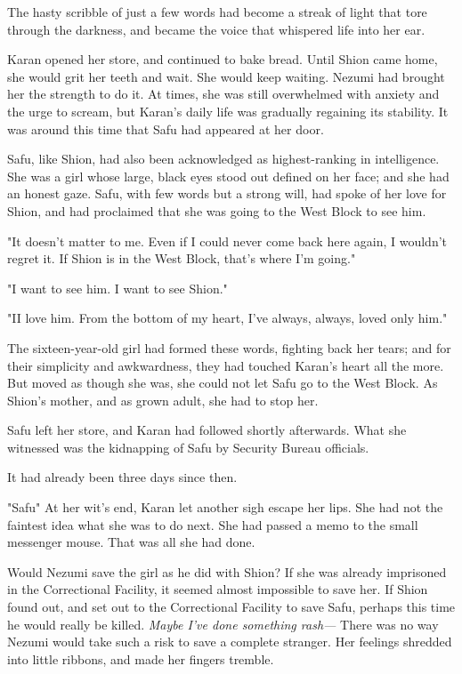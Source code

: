 The hasty scribble of just a few words had become a streak of light that
tore through the darkness, and became the voice that whispered life into
her ear.

Karan opened her store, and continued to bake bread. Until Shion came
home, she would grit her teeth and wait. She would keep waiting. Nezumi
had brought her the strength to do it. At times, she was still
overwhelmed with anxiety and the urge to scream, but Karan's daily life
was gradually regaining its stability. It was around this time that Safu
had appeared at her door.

Safu, like Shion, had also been acknowledged as highest-ranking in
intelligence. She was a girl whose large, black eyes stood out defined
on her face; and she had an honest gaze. Safu, with few words but a
strong will, had spoke of her love for Shion, and had proclaimed that
she was going to the West Block to see him.

"It doesn't matter to me. Even if I could never come back here again, I
wouldn't regret it. If Shion is in the West Block, that's where I'm
going."

"I want to see him. I want to see Shion."

"I\el I love him. From the bottom of my heart, I've always, always,
loved only him."

The sixteen-year-old girl had formed these words, fighting back her
tears; and for their simplicity and awkwardness, they had touched
Karan's heart all the more. But moved as though she was, she could not
let Safu go to the West Block. As Shion's mother, and as grown adult,
she had to stop her.

Safu left her store, and Karan had followed shortly afterwards. What she
witnessed was the kidnapping of Safu by Security Bureau officials.

It had already been three days since then.

"Safu\el " At her wit's end, Karan let another sigh escape her lips. She
had not the faintest idea what she was to do next. She had passed a memo
to the small messenger mouse. That was all she had done.

Would Nezumi save the girl as he did with Shion? If she was already
imprisoned in the Correctional Facility, it seemed almost impossible to
save her. If Shion found out, and set out to the Correctional Facility
to save Safu, perhaps this time he would really be killed. \emph{Maybe I've
done something rash---} There was no way Nezumi would take such a risk to
save a complete stranger. Her feelings shredded into little ribbons, and
made her fingers tremble.

